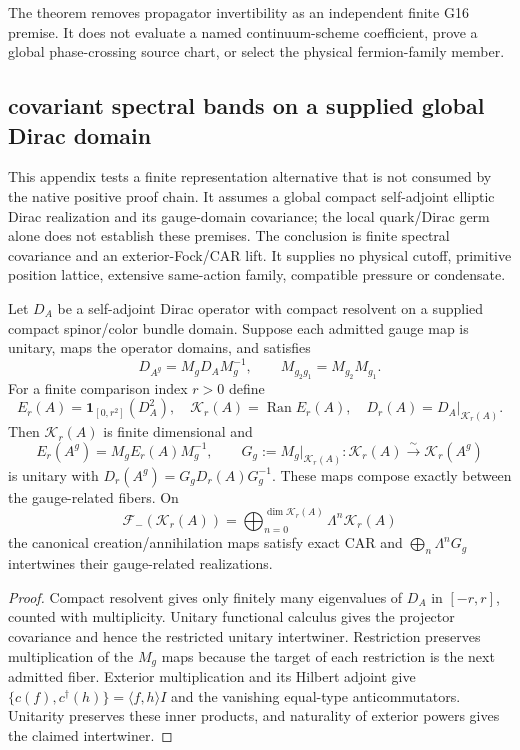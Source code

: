 \documentclass[12pt,a4paper]{article}
\begin{document}
\begin{remark}[G16 scope]
\label{p10:rem:v167-g16-scope}
The theorem removes propagator invertibility as an independent finite G16
premise.  It does not evaluate a named continuum-scheme coefficient, prove a
global phase-crossing source chart, or select the physical fermion-family
member.
\end{remark}


\subsection{covariant spectral bands on a supplied global Dirac domain}
\label{p10:app:v2186-covariant-spectral-band}

This appendix tests a finite representation alternative that is not consumed
by the native positive proof chain.  It assumes a global compact
self-adjoint elliptic Dirac realization and its gauge-domain covariance;
the local quark/Dirac germ alone does not establish these premises.
The conclusion is finite spectral covariance and an exterior-Fock/CAR lift.
It supplies no physical cutoff, primitive position lattice, extensive
same-action family, compatible pressure or condensate.

\begin{proposition}
\label{p10:prop:v2186-covariant-dirac-band-car}
Let $D_A$ be a self-adjoint Dirac operator with compact resolvent on a
supplied compact spinor/color bundle domain.  Suppose each admitted gauge
map is unitary, maps the operator domains, and satisfies
\[
 D_{A^g}=M_gD_AM_g^{-1},\qquad
 M_{g_2g_1}=M_{g_2}M_{g_1}.
\]
For a finite comparison index $r>0$ define
\[
 E_r(A)=\mathbf1_{[0,r^2]}(D_A^2),\quad
 \mathcal K_r(A)=\operatorname{Ran}E_r(A),\quad
 D_r(A)=D_A|_{\mathcal K_r(A)}.
\]
Then $\mathcal K_r(A)$ is finite dimensional and
\[
 E_r(A^g)=M_gE_r(A)M_g^{-1},\qquad
 G_g:=M_g|_{\mathcal K_r(A)}:
 \mathcal K_r(A)\xrightarrow{\sim}\mathcal K_r(A^g)
\]
is unitary with
$D_r(A^g)=G_gD_r(A)G_g^{-1}$.  These maps compose exactly between the
gauge-related fibers.  On
\[
 \mathcal F_-(\mathcal K_r(A))
 =\bigoplus_{n=0}^{\dim\mathcal K_r(A)}\Lambda^n\mathcal K_r(A)
\]
the canonical creation/annihilation maps satisfy exact CAR and
$\bigoplus_n\Lambda^nG_g$ intertwines their gauge-related realizations.
\end{proposition}
\begin{proof}
Compact resolvent gives only finitely many eigenvalues of $D_A$ in
$[-r,r]$, counted with multiplicity.  Unitary functional calculus gives the
projector covariance and hence the restricted unitary intertwiner.
Restriction preserves multiplication of the $M_g$ maps because the target
of each restriction is the next admitted fiber.  Exterior multiplication
and its Hilbert adjoint give
$\{c(f),c^\dagger(h)\}=\langle f,h\rangle I$ and the vanishing equal-type
anticommutators.  Unitarity preserves these inner products, and naturality
of exterior powers gives the claimed intertwiner.
\end{proof}
\end{document}
